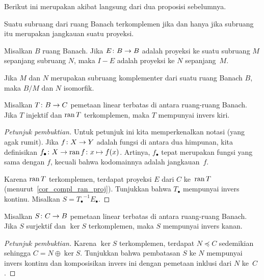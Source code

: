 Berikut ini merupakan akibat langsung dari dua proposisi sebelumnya.

\begin{cor}\label{cor_compl_ran_proj} Suatu subruang dari ruang Banach terkomplemen jika dan hanya jika subruang itu
merupakan jangkauan suatu proyeksi.
\end{cor}

\begin{prop} Misalkan $B$ ruang Banach. Jika $E \colon B \rightarrow B$ adalah proyeksi ke suatu subruang
$M$ sepanjang subruang $N$, maka $I - E$ adalah proyeksi ke $N$ sepanjang~$M$.
\end{prop}

\begin{prop}\label{C069824} Jika $M$ dan $N$ merupakan subruang komplementer dari suatu ruang Banach $B$, maka $B/M$ dan
$N$ isomorfik.
\end{prop}

\begin{prop}\label{prop_linv_Bsp} Misalkan $T \colon B \rightarrow C$ pemetaan linear terbatas di antara ruang-ruang Banach.
Jika $T$ injektif dan $\operatorname{ran} T$ terkomplemen, maka $T$ mempunyai invers kiri.
\end{prop}

\begin{proof}[\emph{Petunjuk pembuktian}] Untuk petunjuk ini kita memperkenalkan notasi (yang agak rumit).
Jika $f\colon X \rightarrow Y$ adalah fungsi di antara dua himpunan, kita definisikan
$f_\bullet \colon X \rightarrow \operatorname{ran} f\colon x \mapsto f(x)$. Artinya, $f_\bullet$ tepat merupakan fungsi yang sama
dengan $f$, kecuali bahwa kodomainnya adalah jangkauan~$f$.

Karena $\operatorname{ran} T$ terkomplemen, terdapat proyeksi $E$ dari $C$ ke~$\operatorname{ran} T$
(menurut~\ref{cor_compl_ran_proj}). Tunjukkan bahwa $T_\bullet$ mempunyai invers kontinu.
Misalkan $S = {T_\bullet}^{-1}E_\bullet$.    \ns
\end{proof}

\begin{prop}\label{prop_rinv_Bsp} Misalkan $S \colon C \rightarrow B$ pemetaan linear terbatas di antara ruang-ruang Banach.
Jika $S$ surjektif dan $\ker S$ terkomplemen, maka $S$ mempunyai invers kanan.
\end{prop}

\begin{proof}[\emph{Petunjuk pembuktian}] Karena $\ker S$ terkomplemen, terdapat $N \preccurlyeq C$ sedemikian sehingga
$C = N \oplus \ker S$. Tunjukkan bahwa pembatasan $S$ ke $N$ mempunyai invers kontinu dan komposisikan
invers ini dengan pemetaan inklusi dari $N$ ke~$C$.   \ns
\end{proof}

